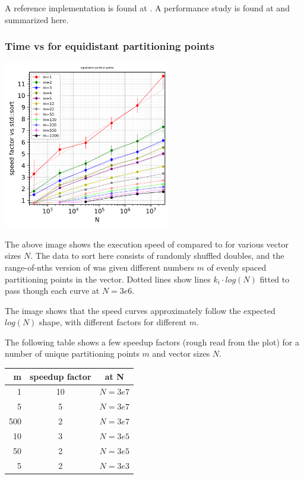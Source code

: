 A reference implementation is found at \cite{p2375src}. A performance study is found at \cite{p2375RefImpl} and summarized here. 
\subsubsection*{Time vs  for equidistant partitioning points}

\begin{center}
\includegraphics[width=0.55\textwidth]{plotting/images/partition_points_equidistant_speed_for_n_vs_sort.png}
\end{center}

The above image shows the execution speed of  compared to  for various vector sizes $N$.
The data to sort here consists of randomly shuffled doubles, and the range-of-nths version of  was given different numbers $m$ of evenly spaced partitioning points in the vector. Dotted lines show lines $k_i \cdot log(N)$ fitted to pass though each curve at $N=3e6$.

The image shows that the speed curves approximately follow the expected $log(N)$ shape, with different factors for different $m$.

The following table shows a few speedup factors (rough read from the plot) for a number of unique partitioning points $m$ and vector sizes $N$.

\begin{center}
\begin{tabular}{|r|c|c|} %
  \hline 
  \textbf{m} & \textbf{speedup factor} & \textbf{at N}\\
  \hline 
1 & 10 & $N=3e7$\\
5 & 5 & $N=3e7$\\
500 & 2 & $N=3e7$\\
\hline
10 & 3 & $N=3e5$\\
50 & 2 & $N=3e5$\\
\hline
5 & 2 & $N=3e3$\\
  \hline 
\end{tabular}
\end{center}

